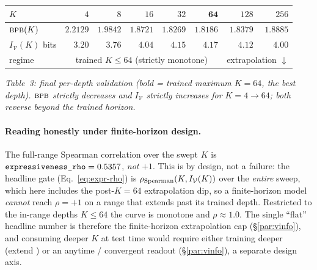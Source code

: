\documentclass[11pt]{article}
\newcommand{\bpb}{\textsc{bpb}}
\newcommand{\code}[1]{\texttt{#1}}
\begin{document}
\begin{center}
\footnotesize
\renewcommand{\arraystretch}{1.15}
\setlength{\tabcolsep}{6pt}
\begin{tabular}{@{}l r r r r r r r@{}}
\toprule
\(K\) & \(4\) & \(8\) & \(16\) & \(32\) & \(\mathbf{64}\) & \(128\) & \(256\) \\
\midrule
\(\bpb(K)\)              & \(2.2129\) & \(1.9842\) & \(1.8721\) & \(1.8269\) & \(\mathbf{1.8186}\) & \(1.8379\) & \(1.8885\) \\
\(I_{\mathcal V}(K)\) bits & \(3.20\)   & \(3.76\)   & \(4.04\)   & \(4.15\)   & \(\mathbf{4.17}\)   & \(4.12\)   & \(4.00\) \\
regime                  & \multicolumn{5}{c}{\hrulefill\ trained \(K\le64\) (strictly monotone)\ \hrulefill} & \multicolumn{2}{c}{extrapolation \(\downarrow\)} \\
\bottomrule
\end{tabular}

\smallskip
\emph{Table~3: final per-depth validation (bold = trained maximum \(K{=}64\), the best depth).
\(\bpb\) strictly decreases and \(I_{\mathcal V}\) strictly increases for \(K{=}4{\to}64\); both reverse
beyond the trained horizon.}
\end{center}

\paragraph{Reading \code{} honestly under finite-horizon design.}
The full-range Spearman correlation over the swept \(K\) is
\(\code{\detokenize{expressiveness_rho}}=0.5357\), \emph{not} \(+1\).  This is by design, not a failure:
the headline gate (Eq.~\eqref{eq:expr-rho}) is \(\rho_{\rm Spearman}(K,I_{\mathcal V}(K))\) over the
\emph{entire} sweep, which here includes the post-\(K{=}64\) extrapolation dip, so a finite-horizon model
\emph{cannot} reach \(\rho=+1\) on a range that extends past its trained depth.  Restricted to the
in-range depths \(K\le64\) the curve is monotone and \(\rho\approx1.0\).  The single ``flat'' headline
number is therefore the finite-horizon extrapolation cap (\S\ref{par:vinfo}), and consuming deeper \(K\)
at test time would require either training deeper (extend \code{}) or an anytime /
convergent readout (\S\ref{par:vinfo}), a separate design axis.
\end{document}
